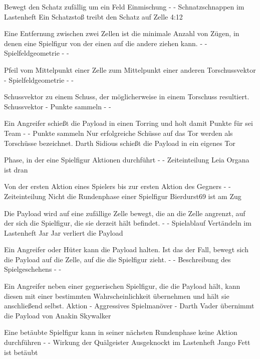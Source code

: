 {Bewegt den Schatz zufällig um ein Feld}
{Einmischung}
{-}
{-}
{\glqq{}Schnatzschnappen\grqq{}  im Lastenheft}
{Ein Schatzstoß treibt den Schatz auf Zelle 4:12}

{Eine Entfernung zwischen zwei Zellen ist die minimale Anzahl von Zügen, in denen eine Spielfigur von der einen auf die andere ziehen kann.}
{-}
{-}
{Spielfeldgeometrie}
{-}
{-}

{Pfeil vom Mittelpunkt einer Zelle zum Mittelpunkt einer anderen}
{Torschussvektor}
{-}
{Spielfeldgeometrie}
{-}
{-}

{Schussvektor zu einem Schuss, der möglicherweise in einem Torschuss resultiert.}
{Schussvektor}
{-}
{Punkte sammeln}
{-}
{-}

{Ein Angreifer schießt die Payload in einen Torring und holt damit Punkte für sei Team}
{-}
{-}
{Punkte sammeln}
{Nur erfolgreiche Schüsse auf das Tor werden als Torschüsse bezeichnet.}
{Darth Sidious schießt die Payload in ein eigenes Tor}

{Phase, in der eine Spielfigur Aktionen durchführt}
{-}
{-}
{Zeiteinteilung}
{}
{Leia Organa ist dran}

{Von der ersten Aktion eines Spielers bis zur ersten Aktion des Gegners}
{-}
{-}
{Zeiteinteilung}
{Nicht die Rundenphase einer Spielfigur}
{Bierdurst69 ist am Zug}

{Die Payload wird auf eine zufällige Zelle bewegt, die an die Zelle angrenzt, auf der sich die Spielfigur, die sie derzeit hält befindet.}
{-}
{-}
{Spielablauf}
{\glqq{}Vertändeln\grqq{}  im Lastenheft}
{Jar Jar verliert die Payload}

{Ein Angreifer oder Hüter kann die Payload halten. Ist das der Fall, bewegt sich die Payload auf die Zelle, auf die die Spielfigur zieht.}
{-}
{-}
{Beschreibung des Spielgeschehens}
{-}
{-}

{Ein Angreifer neben einer gegnerischen Spielfigur, die die Payload hält, kann diesen mit einer bestimmten Wahrscheinlichkeit übernehmen und hält sie anschließend selbst.}
{Aktion}
{-}
{Aggressives Spielmanöver}
{-}
{Darth Vader übernimmt die Payload von Anakin Skywalker}

{Eine betäubte Spielfigur kann in seiner nächsten Rundenphase keine Aktion durchführen}
{-}
{-}
{Wirkung der Quälgeister}
{\glqq{}Ausgeknockt\grqq{}  im Lastenheft}
{Jango Fett ist betäubt}


